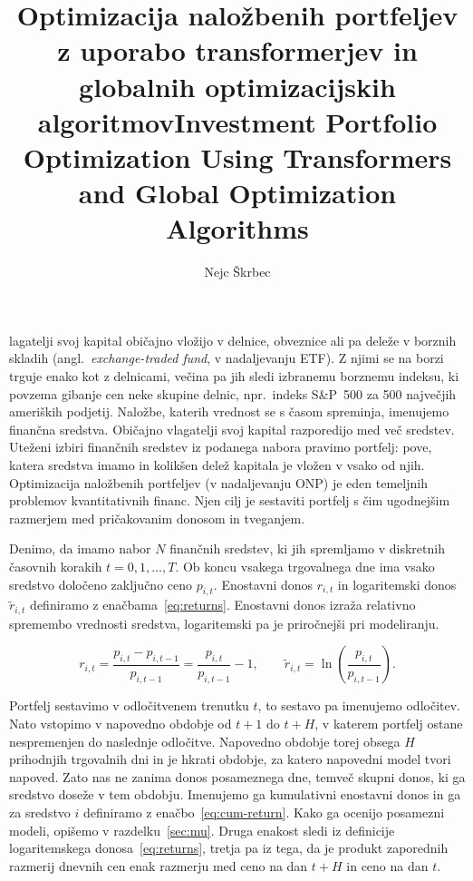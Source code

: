 \documentclass[9pt]{style/friteza}
\title[slovene]{Optimizacija naložbenih portfeljev z uporabo transformerjev in globalnih optimizacijskih algoritmov}
\title[english]{Investment Portfolio Optimization Using Transformers and Global Optimization Algorithms}
\author{Nejc Škrbec}
\begin{document}
\maketitle

lagatelji svoj kapital običajno vložijo v delnice, obveznice ali pa deleže v borznih skladih (angl.\ \emph{exchange-traded fund}, v nadaljevanju ETF). Z njimi se na borzi trguje enako kot z delnicami, večina pa jih sledi izbranemu borznemu indeksu, ki povzema gibanje cen neke skupine delnic, npr.\ indeks S\&P~500 za 500 največjih ameriških podjetij. Naložbe, katerih vrednost se s časom spreminja, imenujemo finančna sredstva. Običajno vlagatelji svoj kapital razporedijo med več sredstev. Uteženi izbiri finančnih sredstev iz podanega nabora pravimo portfelj: pove, katera sredstva imamo in kolikšen delež kapitala je vložen v vsako od njih. Optimizacija naložbenih portfeljev (v nadaljevanju ONP) je eden temeljnih problemov kvantitativnih financ. Njen cilj je sestaviti portfelj s čim ugodnejšim razmerjem med pričakovanim donosom in tveganjem.

Denimo, da imamo nabor $N$ finančnih sredstev, ki jih spremljamo v diskretnih časovnih korakih $t=0,1,\dots,T$. Ob koncu vsakega trgovalnega dne ima vsako sredstvo določeno zaključno ceno $p_{i,t}$. Enostavni donos $r_{i,t}$ in logaritemski donos $\tilde r_{i,t}$ definiramo z enačbama~\eqref{eq:returns}. Enostavni donos izraža relativno spremembo vrednosti sredstva, logaritemski pa je priročnejši pri modeliranju.

\begin{equation}
\label{eq:returns}
r_{i,t}
=
\frac{p_{i,t}-p_{i,t-1}}{p_{i,t-1}}
=
\frac{p_{i,t}}{p_{i,t-1}}-1,
\qquad
\tilde r_{i,t}
=
\ln\left(
\frac{p_{i,t}}{p_{i,t-1}}
\right).
\end{equation}

Portfelj sestavimo v odločitvenem trenutku $t$, to sestavo pa imenujemo odločitev. Nato vstopimo v napovedno obdobje od $t+1$ do $t+H$, v katerem portfelj ostane nespremenjen do naslednje odločitve. Napovedno obdobje torej obsega $H$ prihodnjih trgovalnih dni in je hkrati obdobje, za katero napovedni model tvori napoved. Zato nas ne zanima donos posameznega dne, temveč skupni donos, ki ga sredstvo doseže v tem obdobju. Imenujemo ga kumulativni enostavni donos in ga za sredstvo $i$ definiramo z enačbo~\eqref{eq:cum-return}. Kako ga ocenijo posamezni modeli, opišemo v razdelku~\ref{sec:mu}. Druga enakost sledi iz definicije logaritemskega donosa~\eqref{eq:returns}, tretja pa iz tega, da je produkt zaporednih razmerij dnevnih cen enak razmerju med ceno na dan $t+H$ in ceno na dan $t$.
\end{document}
